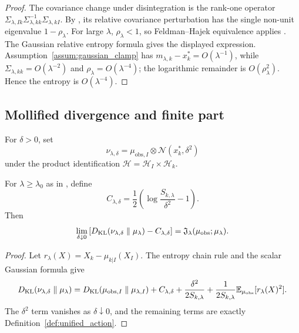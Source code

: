 \begin{proof}
The covariance change under disintegration is the rank-one operator
$\Sigma_{\lambda,Ik}\Sigma_{\lambda,kk}^{-1}\Sigma_{\lambda,kI}$.  By
, its relative covariance perturbation has the
single non-unit eigenvalue $1-\rho_\lambda$.  For large $\lambda$,
$\rho_\lambda<1$, so Feldman--Hajek equivalence applies
\cite{feldman1958equivalence,bogachev1998gaussian}.  The Gaussian relative
entropy formula gives the displayed expression.  Assumption~\ref{assum:gaussian_clamp}
has $m_{\lambda,k}-x_k^*=O(\lambda^{-1})$, while
$\Sigma_{\lambda,kk}=O(\lambda^{-2})$ and $\rho_\lambda=O(\lambda^{-4})$; the
logarithmic remainder is $O(\rho_\lambda^2)$.  Hence the entropy is
$O(\lambda^{-4})$.
\end{proof}

\subsection{Mollified divergence and finite part}

For $\delta>0$, set
\[
  \nu_{\lambda,\delta}
  =
  \mu_{\mathrm{obs},I}\otimes\mathcal{N}(x_k^*,\delta^2)
\]
under the product identification
$\mathcal{H}=\mathcal{H}_I\times\mathcal{H}_k$.

\begin{proposition}
\label{prop:mollification_limit}
For $\lambda\ge\lambda_0$ as in , define
\[
  C_{\lambda,\delta}
  =
  \frac12\left(\log\frac{S_{k,\lambda}}{\delta^2}-1\right).
\]
Then
\[
  \lim_{\delta\downarrow0}
  \left[
    D_{\operatorname{KL}}(\nu_{\lambda,\delta}\parallel\mu_\lambda)
    -C_{\lambda,\delta}
  \right]
  =
  \mathfrak{J}_\lambda(\mu_{\mathrm{obs}};\mu_\lambda).
\]
\end{proposition}

\begin{proof}
Let $r_\lambda(X)=X_k-\mu_{k|I}(X_I)$.  The entropy chain rule and the scalar
Gaussian formula give
\[
  D_{\operatorname{KL}}(\nu_{\lambda,\delta}\parallel\mu_\lambda)
  =
  D_{\operatorname{KL}}(\mu_{\mathrm{obs},I}\parallel\mu_{\lambda,I})
  +C_{\lambda,\delta}
  +\frac{\delta^2}{2S_{k,\lambda}}
  +\frac{1}{2S_{k,\lambda}}
   \mathbb{E}_{\mu_{\mathrm{obs}}}[r_\lambda(X)^2].
    \]
    The $\delta^2$ term vanishes as $\delta\downarrow0$, and the remaining terms
    are exactly Definition~\ref{def:unified_action}.
\end{proof}

